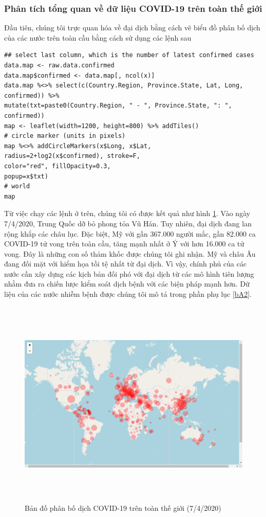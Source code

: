 \documentclass[12pt, a4paper,oneside]{book}
\theoremstyle{definition}
\begin{document}
\subsubsection{Phân tích tổng quan về dữ liệu COVID-19 trên toàn thế giới}
Đầu tiên, chúng tôi trực quan hóa về đại dịch bằng cách vẽ biểu đồ phân bố dịch của các nước trên toàn cầu bằng cách sử dụng các lệnh sau
\begin{lstlisting}
## select last column, which is the number of latest confirmed cases
data.map <- raw.data.confirmed
data.map$confirmed <- data.map[, ncol(x)]
data.map %<>% select(c(Country.Region, Province.State, Lat, Long, confirmed)) %>%
mutate(txt=paste0(Country.Region, " - ", Province.State, ": ", confirmed))
map <- leaflet(width=1200, height=800) %>% addTiles()
# circle marker (units in pixels)
map %<>% addCircleMarkers(x$Long, x$Lat,
radius=2+log2(x$confirmed), stroke=F,
color="red", fillOpacity=0.3,
popup=x$txt)
# world
map
\end{lstlisting}
Từ việc chạy các lệnh ở trên, chúng tôi có được kết quả như hình \ref{h21}. Vào ngày 7/4/2020, Trung Quốc dỡ bỏ phong tỏa Vũ Hán. Tuy nhiên, đại dịch đang lan rộng khắp các châu lục. Đặc biệt, Mỹ với gần 367.000 người mắc, gần 82.000 ca COVID-19 tử vong trên toàn cầu, tăng mạnh nhất ở Ý với hơn 16.000 ca tử vong. Đây là những con số thảm khốc được chúng tôi ghi nhận. Mỹ và châu Âu đang đối mặt với hiểm họa tồi tệ nhất từ đại dịch. Vì vậy, chính phủ của các nước cần xây dựng các kịch bản đối phó với đại dịch từ các mô hình tiên lượng nhằm đưa ra chiến lược kiểm soát dịch bệnh với các biện pháp mạnh hơn. Dữ liệu của các nước nhiễm bệnh được chúng tôi mô tả trong phần phụ lục \ref{bA2}. 
\begin{figure}[!htb]
	\label{h21}
	\centering
	\includegraphics[width=1\linewidth,height=10cm]{anh/Rplot}  
	\vskip-4mm
	\caption{Bản đồ phân bố dịch COVID-19 trên toàn thế giới (7/4/2020)}
\end{figure}\\
\end{document}
